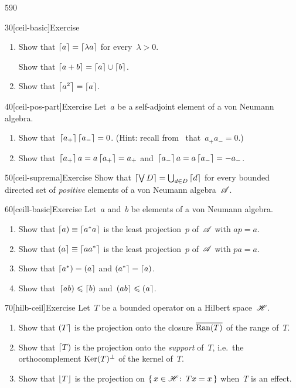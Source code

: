 \begin{parsec}{590}
\begin{point}{30}[ceil-basic]{Exercise}
\begin{enumerate}
\item
Show that $\left\lceil a\right\rceil=\left\lceil\lambda a\right\rceil$
for every~$\lambda>0$.

Show that $\left\lceil a+b\right\rceil=\left\lceil a\right\rceil\cup\left\lceil b\right\rceil$.
\item
Show that $\left\lceil a^2\right\rceil=\left\lceil a\right\rceil$.
\end{enumerate}
\spacingfix%
\end{point}%
\begin{point}{40}[ceil-pos-part]{Exercise}%
Let~$a$ be a self-adjoint element of a von Neumann algebra.
\begin{enumerate}
\item
Show that~$\left\lceil a_+\right\rceil\left\lceil a_-\right\rceil= 0$.
(Hint: recall from~ that~$a_+a_-=0$.)
\item
	Show that~$\left\lceil a_+\right\rceil a = a\left\lceil a_+\right\rceil = a_+$
	and~$\left\lceil a_-\right\rceil a=a\left\lceil a_-\right\rceil = -a_-$.
\end{enumerate}
\spacingfix%
\end{point}
\begin{point}{50}[ceil-suprema]{Exercise}%
Show that $\left\lceil\bigvee D\right\rceil = \bigcup_{d\in D}\left\lceil d\right\rceil$
for every bounded directed set of \emph{positive}
elements of a von Neumann algebra~$\mathscr{A}$.
\end{point}
\begin{point}{60}[ceill-basic]{Exercise}%
Let~$a$ and~$b$  be elements of a von Neumann algebra.
\begin{enumerate}
\item
Show that $\left\lceil a\right)\equiv \left\lceil a^*a\right\rceil$
is the least projection~$p$ of~$\mathscr{A}$
with $ap =a$.

\item
Show that $\left(a\right\rceil\equiv \left\lceil aa^*\right\rceil$
is the least projection~$p$ of~$\mathscr{A}$
with $pa=a$.

\item
Show that $\left\lceil a^*\right)=\left(a\right\rceil$
and $\left(a^*\right\rceil=\left\lceil a\right)$.

\item
Show that~$\left\lceil ab\right)\leqslant\left\lceil b\right)$
and~$\left(ab\right\rceil\leqslant\left(a\right\rceil$.
\end{enumerate}
\spacingfix%
\end{point}
\begin{point}{70}[hilb-ceil]{Exercise}%
Let~$T$ be a bounded operator on a Hilbert space~$\mathscr{H}$.
\begin{enumerate}
\item
Show that $\left(T\right\rceil$
is the projection onto the closure
$\overline{\operatorname{Ran}(T)}$ of the range of~$T$.
\item
Show that $\left\lceil T\right)$
is the projection onto the \emph{support}
of~$T$, i.e.~the orthocomplement
$\operatorname{Ker}(T)^\perp$ of the kernel of~$T$.
\item
Show that $\left\lfloor T\right\rfloor$ is the projection
on $\{\,x\in\mathscr{H}\colon\, Tx=x\,\}$
when~$T$ is an effect.
\end{enumerate}
\spacingfix%
\end{point}%
\end{parsec}%
